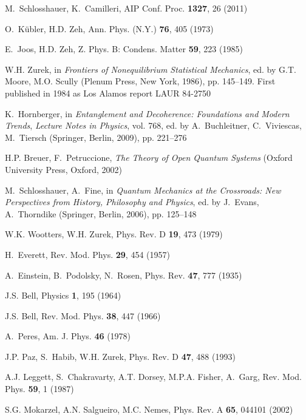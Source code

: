 \documentclass[aps,pra,reprint,amsmath,amssymb,showpacs,nofootinbib,floatfix,onecolumn,12pt]{revtex4-1}
\begin{document}
\begin{thebibliography}{100}
M.~Schlosshauer, K.~Camilleri, AIP Conf. Proc. \textbf{1327}, 26 (2011)

O.~K{\"u}bler, H.D. Zeh, Ann. Phys. (N.Y.) \textbf{76}, 405 (1973)

E.~Joos, H.D. Zeh, Z. Phys. B: Condens. Matter \textbf{59}, 223 (1985)

W.H. Zurek, in \emph{Frontiers of Nonequilibrium Statistical Mechanics}, ed. by
  G.T. Moore, M.O. Scully (Plenum Press, New York, 1986), pp. 145--149.
\newblock First published in 1984 as Los Alamos report LAUR 84-2750

K.~Hornberger, in \emph{Entanglement and Decoherence: Foundations and Modern
  Trends}, \emph{Lecture Notes in Physics}, vol. 768, ed. by A.~Buchleitner,
  C.~Viviescas, M.~Tiersch (Springer, Berlin, 2009), pp. 221--276

H.P. Breuer, F.~Petruccione, \emph{The Theory of Open Quantum Systems} (Oxford
  University Press, Oxford, 2002)

M.~Schlosshauer, A.~Fine, in \emph{Quantum Mechanics at the Crossroads: New
  Perspectives from History, Philosophy and Physics}, ed. by J.~Evans,
  A.~Thorndike (Springer, Berlin, 2006), pp. 125--148

W.K. Wootters, W.H. Zurek, Phys. Rev. D \textbf{19}, 473 (1979)

H.~Everett, Rev. Mod. Phys. \textbf{29}, 454 (1957)

A.~Einstein, B.~Podolsky, N.~Rosen, Phys. Rev. \textbf{47}, 777 (1935)

J.S. Bell, Physics \textbf{1}, 195 (1964)

J.S. Bell, Rev. Mod. Phys. \textbf{38}, 447 (1966)

A.~Peres, Am. J. Phys. \textbf{46} (1978)

J.P. Paz, S.~Habib, W.H. Zurek, Phys. Rev. D \textbf{47}, 488 (1993)

A.J. Leggett, S.~Chakravarty, A.T. Dorsey, M.P.A. Fisher, A.~Garg, Rev. Mod.
  Phys. \textbf{59}, 1 (1987)

S.G. Mokarzel, A.N. Salgueiro, M.C. Nemes, Phys. Rev. A \textbf{65}, 044101
  (2002)


\end{thebibliography}
\end{document}
